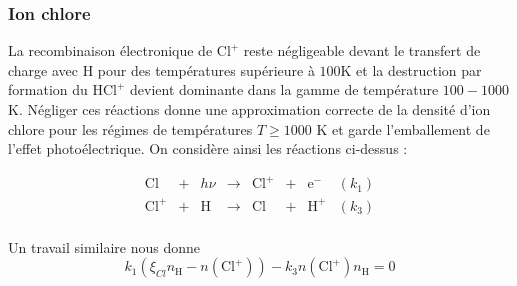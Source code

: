 




\subsubsection{Ion chlore}

La recombinaison électronique de $\mathrm{Cl}^+$ reste négligeable devant le transfert de charge avec $\mathrm{H}$ pour des températures supérieure à $100$K et la destruction par formation du $\mathrm{HCl}^+$ devient dominante dans la gamme de température $100-1000$K. Négliger ces réactions donne une approximation correcte de la densité d'ion chlore pour les régimes de températures $T\geq 1000$ K et garde l'emballement de l'effet photoélectrique. On considère ainsi les réactions ci-dessus :


\begin{equation}
    \begin{array}{lccccclr}
       \mathrm{Cl}  & + & h\nu & \rightarrow & \mathrm{Cl}^+ & + & \mathrm{e}^- & (k_1) \\
        \mathrm{Cl}^+ & + &\mathrm{H}   & \rightarrow &\mathrm{Cl}  & + & \mathrm{H}^+ & (k_3) \\
    \end{array}
\end{equation}

Un travail similaire nous donne 
\begin{equation}
    k_1(\xi_{Cl}n_{\mathrm{H}} - n(\mathrm{Cl}^+)) - k_3 n(\mathrm{Cl}^+) n_{\mathrm{H}} = 0
\end{equation}


